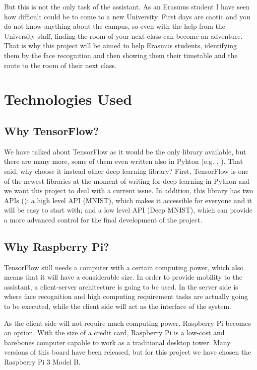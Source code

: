But this is not the only task of the assistant. As an Erasmus student I have seen how difficult could be to come to a new University. First days are caotic and you do not know anything about the campus, so even with the help from the University staff, finding the room of your next class can become an adventure. That is why this project will be aimed to help Erasmus students, identifying them by the face recognition and then showing them their timetable and the route to the room of their next class.

\section{Technologies Used}	

	\subsection{Why TensorFlow?}
	We have talked about TensorFlow as it would be the only library available, but there are many more, some of them even written also in Pyhton (e.g. \cite{theano_main_site}, \cite{caffe_main_site}). That said, why choose it instead other deep learning library? First, TensorFlow is one of the newest libraries at the moment of writing for deep learning in Python and we want this project to deal with a current issue. In addition, this library has two APIs (\cite{tensorflow_main_website}): a high level API (MNIST), which makes it accessible for everyone and it will be easy to start with; and a low level API (Deep MNIST), which can provide a more advanced control for the final development of the project.

	\subsection{Why Raspberry Pi?}
	TensorFlow still needs a computer with a certain computing power, which also means that it will have a considerable size. In order to provide mobility to the assistant, a client-server architecture is going to be used. In the server side is where face recognition and high computing requirement tasks are actually going to be executed, while the client side will act as the interface of the system. 

	As the client side will not require much computing power, Raspberry Pi becomes an option. With the size of a credit card, Raspberry Pi is a low-cost and barebones computer capable to work as a traditional desktop tower. Many versions of this board have been released, but for this project we have chosen the Raspberry Pi 3 Model B.

